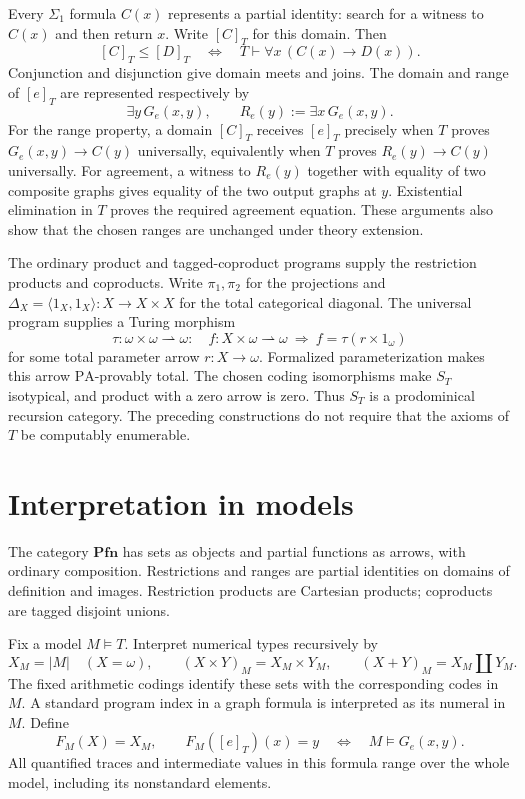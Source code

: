 \documentclass[11pt]{article}
\newcommand{\PA}{\mathrm{PA}}
\newcommand{\Pfn}{\mathbf{Pfn}}
\begin{document}
Every $\Sigma_1$ formula $C(x)$ represents a partial identity: search for
a witness to $C(x)$ and then return $x$. Write $[C]_T$ for this domain.
Then
\begin{equation}\label{eq:domain-order}
 [C]_T\le[D]_T
 \quad\Longleftrightarrow\quad
 T\vdash\forall x\,(C(x)\longrightarrow D(x)).
\end{equation}
Conjunction and disjunction give domain meets and joins. The domain and
range of $[e]_T$ are represented respectively by
\[
 \exists y\,G_e(x,y),\qquad
 R_e(y):=\exists x\,G_e(x,y).
\]
For the range property, a domain $[C]_T$ receives $[e]_T$ precisely when
$T$ proves $G_e(x,y)\to C(y)$ universally, equivalently when
$T$ proves $R_e(y)\to C(y)$ universally. For agreement, a witness to
$R_e(y)$ together with equality of two composite graphs gives equality
of the two output graphs at $y$. Existential elimination in $T$ proves
the required agreement equation. These arguments also show that the
chosen ranges are unchanged under theory extension.

The ordinary product and tagged-coproduct programs supply the restriction
products and coproducts. Write $\pi_1,\pi_2$ for the projections and
$\Delta_X=\langle1_X,1_X\rangle:X\to X\times X$ for the total categorical
diagonal. The universal program supplies a Turing morphism
\[
 \tau:\omega\times\omega\rightharpoonup\omega:
 \quad f:X\times\omega\rightharpoonup\omega
 \ \Longrightarrow\ 
 f=\tau(r\times1_\omega)
\]
for some total parameter arrow $r:X\to\omega$. Formalized
parameterization makes this arrow $\PA$-provably total. The chosen coding
isomorphisms make $S_T$ isotypical, and product with a zero arrow is zero.
Thus $S_T$ is a prodominical recursion category. The preceding
constructions do not require that the axioms of $T$ be computably enumerable.

\section{Interpretation in models}\label{sec:models}

The category $\Pfn$ has sets as objects and partial functions as arrows,
with ordinary composition. Restrictions and ranges are partial identities
on domains of definition and images. Restriction products are Cartesian products;
coproducts are tagged disjoint unions.

Fix a model $M\models T$. Interpret numerical types recursively by
\[
 X_M=|M|\quad(X=\omega),\qquad
 (X\times Y)_M=X_M\times Y_M,\qquad
 (X+Y)_M=X_M\amalg Y_M.
\]
The fixed arithmetic codings identify these sets with the corresponding
codes in $M$. A standard program index in a graph formula is interpreted
as its numeral in $M$. Define
\begin{equation}\label{eq:model-functor}
 F_M(X)=X_M,\qquad
 F_M([e]_T)(x)=y
 \quad\Longleftrightarrow\quad M\models G_e(x,y).
\end{equation}
All quantified traces and intermediate values in this formula range over
the whole model, including its nonstandard elements.
\end{document}
